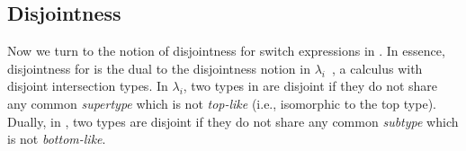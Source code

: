 
\begin{comment}
\begin{lemma}[Subtyping Reflexivity]
  $[[A <: A]]$.
\label{lemma:union:refl}
\end{lemma}

\begin{proof}
  By induction on type A. All cases are trivial to prove.
\end{proof}
\begin{lemma}[Subtyping Transitivity]
  If \ $[[A <: B]]$ \ and \ $[[B <: C]]$ \ then \ $[[A <: C]]$.
  \label{lemma:union:trans}
\end{lemma}
\end{comment}
\begin{comment}
\begin{proof}
  By induction on type B.
  \begin{itemize}
    \item Cases $[[Top]]$, $[[Bot]]$ and $[[Int]]$ are trivial to prove.
    \item Case $[[A -> B]]$ requires double induction on type $[[C]]$
          and $[[A]]$.
    \item Case $[[A \/ B]]$ requires \Cref{lemma:union:sub-or}
  \end{itemize}
\end{proof}\bruno{If space is a concern we can probably drop the lemma statements
for reflexivity and transitivity as these are quite standard.}

\begin{lemma}[Subtyping Union Inversion]
\label{lemma:union:sub-or}
  If \ $[[A \/ B <: C]]$ then:
  \begin{enumerate}
    \item $[[A <: C]]$ and
    \item $[[B <: C]]$
  \end{enumerate}
\end{lemma}
\end{comment}


\subsection{Disjointness}
\label{sec:union:disj}
Now we turn to the notion of disjointness for
switch expressions in \cal. In essence, disjointness for \cal is
the dual to the disjointness notion in $\lambda_i$~\cite{oliveira2016disjoint},
a calculus with disjoint intersection types.
In $\lambda_i$, two
types in are disjoint if they do not share any common
\emph{supertype} which is not \emph{top-like} (i.e., isomorphic to the top type). Dually, in
\cal, two types are disjoint if they do not share any common \emph{subtype} which
is not \emph{bottom-like}.

